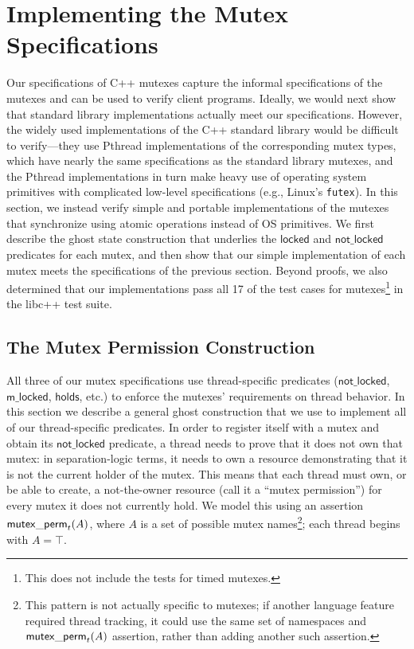 \section{Implementing the Mutex Specifications}
Our specifications of C++ mutexes capture the informal specifications of the mutexes and can be used to verify client programs. Ideally, we would next show that standard library implementations actually meet our specifications. However, the widely used implementations of the C++ standard library would be difficult to verify---they use Pthread implementations of the corresponding mutex types, which have nearly the same specifications as the standard library mutexes, and the Pthread implementations in turn make heavy use of operating system primitives with complicated low-level specifications (e.g., Linux's \lstinline{futex}). In this section, we instead verify simple and portable implementations of the mutexes that synchronize using atomic operations instead of OS primitives. We first describe the ghost state construction that underlies the $\mathsf{locked}$ and $\mathsf{not\_locked}$ predicates for each mutex, and then show that our simple implementation of each mutex meets the specifications of the previous section. Beyond proofs, we also determined that our implementations pass all 17 of the test cases for mutexes\footnote{This does not include the tests for timed mutexes.} in the libc++ test suite\cite{libcpp-tests}.

\subsection{The Mutex Permission Construction}
\label{login}

All three of our mutex specifications use thread-specific predicates ($\mathsf{not\_locked}$, $\mathsf{m\_locked}$, $\mathsf{holds}$, etc.) to enforce the mutexes' requirements on thread behavior. In this section we describe a general ghost construction that we use to implement all of our thread-specific predicates. In order to register itself with a mutex and obtain its $\mathsf{not\_locked}$ predicate, a thread needs to prove that it does not own that mutex: in separation-logic terms, it needs to own a resource demonstrating that it is not the current holder of the mutex. This means that each thread must own, or be able to create, a not-the-owner resource (call it a ``mutex permission'') %
for every mutex it does not currently hold. We model this using an assertion $\mathsf{mutex\_perm}_{t}(A)$, where $A$ is a set of possible mutex names\footnote{This pattern is not actually specific to mutexes; if another language feature required thread tracking, it could use the same set of namespaces and $\mathsf{mutex\_perm}_{t}(A)$ assertion, rather than adding another such assertion.};
each thread begins with $A = \top$.

